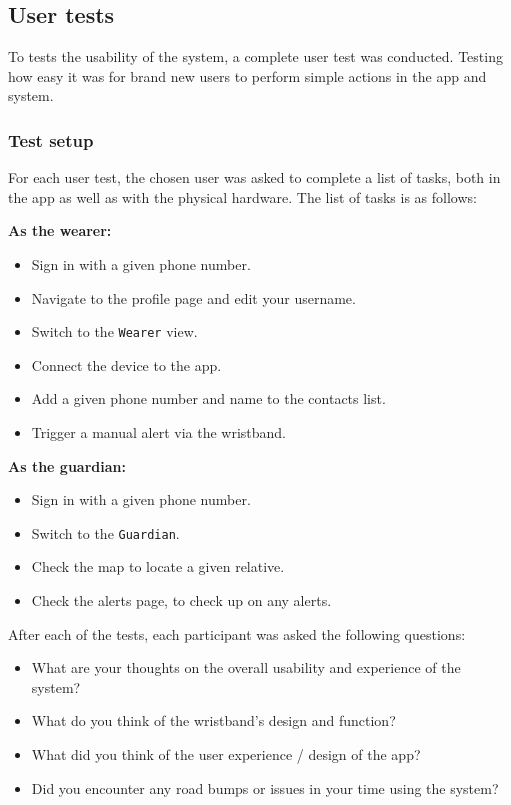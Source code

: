 \subsection{User tests}
To tests the usability of the system, a complete user test was conducted. Testing how easy it was for brand new users to perform simple actions in the app and system. 

\subsubsection{Test setup}
For each user test, the chosen user was asked to complete a list of tasks, both in the app as well as with the physical hardware. The list of tasks is as follows:

\textbf{As the wearer:}
\begin{itemize}
    \item Sign in with a given phone number.
    \item Navigate to the profile page and edit your username.
    \item Switch to the \verb|Wearer| view.
    \item Connect the device to the app.
    \item Add a given phone number and name to the contacts list.
    \item Trigger a manual alert via the wristband.
\end{itemize}

\textbf{As the guardian:}
\begin{itemize}
    \item Sign in with a given phone number.
    \item Switch to the \verb|Guardian|.
    \item Check the map to locate a given relative.
    \item Check the alerts page, to check up on any alerts.
\end{itemize}

After each of the tests, each participant was asked the following questions:

\begin{itemize}
    \item What are your thoughts on the overall usability and experience of the system?
    \item What do you think of the wristband's design and function?
    \item What did you think of the user experience / design of the app?
    \item Did you encounter any road bumps or issues in your time using the system?
\end{itemize}

